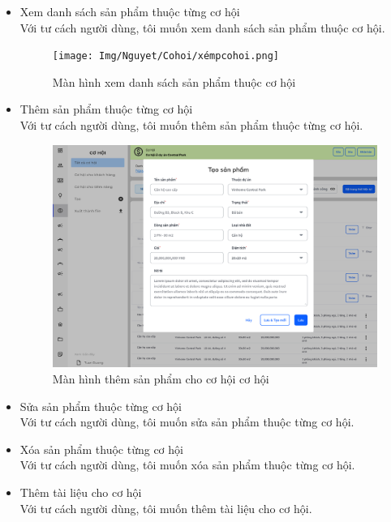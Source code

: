 \documentclass[12pt,a4paper]{article}
\begin{document}
\begin{enumerate}
\begin{itemize}
            \item Xem danh sách sản phẩm thuộc từng cơ hội \\
            Với tư cách người dùng, tôi muốn xem danh sách sản phẩm thuộc cơ hội.
            \begin{figure}[H]
                \centering \texttt{[image: Img/Nguyet/Cohoi/xémpcohoi.png]}
                \vspace{0.5cm}
                \caption{Màn hình xem danh sách sản phẩm thuộc cơ hội }
                \label{dsspcohoi}
            \end{figure}
            \item Thêm sản phẩm thuộc từng cơ hội \\
            Với tư cách người dùng, tôi muốn thêm sản phẩm thuộc từng cơ hội.
            \begin{figure}[H]
                \centering \includegraphics[width=\textwidth]{Img/Nguyet/Cohoi/taosp.png}
                \vspace{0.5cm}
                \caption{Màn hình thêm sản phẩm cho cơ hội cơ hội }
                \label{themspcohoi}
            \end{figure}
            \item Sửa sản phẩm thuộc từng cơ hội \\
            Với tư cách người dùng, tôi muốn sửa sản phẩm thuộc từng cơ hội.
            \item Xóa sản phẩm thuộc từng cơ hội \\
            Với tư cách người dùng, tôi muốn xóa sản phẩm thuộc từng cơ hội.
            \item Thêm tài liệu cho cơ hội \\
            Với tư cách người dùng, tôi muốn thêm tài liệu cho cơ hội.


\end{itemize}
\end{enumerate}
\end{document}
